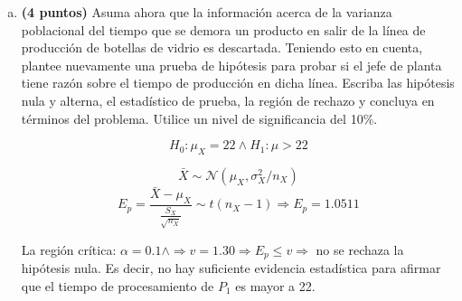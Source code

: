 \documentclass[../main.tex]{subfiles}
\begin{document}
\begin{enumerate}[(a)]
\item \textbf{(4 puntos)} Asuma ahora que la información acerca de la varianza poblacional del tiempo que se demora un producto en salir de la línea de producción de botellas de vidrio es
descartada. Teniendo esto en cuenta, plantee nuevamente una prueba de hipótesis para
probar si el jefe de planta tiene razón sobre el tiempo de producción en dicha línea. Escriba
las hipótesis nula y alterna, el estadístico de prueba, la región de rechazo y concluya en
términos del problema. Utilice un nivel de significancia del 10\%.

$$H_0 : \mu_X = 22 \wedge H_1 : \mu > 22$$

 $$\bar{X} \sim \mathcal{N}(\mu_X, 	\sigma^2_X / n_X)$$
 $$E_p = 	\frac{\bar{X} - \mu_X}{\frac{S_X}{\sqrt{n_X}}} \sim t(n_X - 1) \Rightarrow E_p = 1.0511$$
 
 La región crítica: $\alpha  = 0.1 \wedge \Rightarrow v = 1.30 \Rightarrow E_p \leq v \Rightarrow $ no se rechaza la hipótesis nula. Es decir, no hay suficiente evidencia estadística para afirmar que el tiempo de procesamiento de $P_1$ es mayor a 22.

\end{enumerate}
\end{document}
